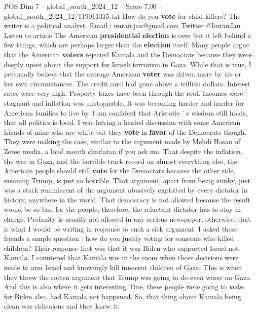 \begin{textsample}{POS Dim 7 – global\_south\_2024\_12 – Score 7.00 – global\_south\_2024\_12/119011315.txt}  \label{ex:f7_pos_348}
How do you \textbf{vote} for child killers?
The writer is a political analyst.
Email : imran.jan@gmail.com Twitter @ImranJan Listen to article The American \textbf{presidential} \textbf{election} is over but it left behind a few things, which are perhaps larger than the \textbf{election} itself.
Many people argue that the American \textbf{voters} rejected Kamala and the Democrats because they were deeply upset about the support for Israeli terrorism in Gaza.
While that is true, I personally believe that the average American \textbf{voter} was driven more by his or her own circumstances.
The credit card had gone above a trillion dollars.
Interest rates were very high.
Property taxes have been through the roof.
Incomes were stagnant and inflation was unstoppable.
It was becoming harder and harder for American families to live by.
I am confident that Aristotle ' s wisdom still holds, that all politics is local.
I was having a heated discussion with some American friends of mine who are white but they \textbf{vote} in \textbf{favor} of the Democrats though.
They were making the case, similar to the argument made by Mehdi Hasan of Zeteo media, a loud mouth charlatan if you ask me.
That despite the inflation, the war in Gaza, and the horrible track record on almost everything else, the American people should still \textbf{vote} for the Democrats because the other side, meaning Trump, is just so horrible.
That argument, apart from being stinky, just was a stark reminiscent of the argument abusively exploited by every dictator in history, anywhere in the world.
That democracy is not allowed because the result would be so bad for the people, therefore, the reluctant dictator has to stay in charge.
Profanity is usually not allowed in any serious newspaper, otherwise, that is what I would be writing in response to such a sick argument.
I asked these friends a simple question : how do you justify voting for someone who killed children?
Their response first was that it was Biden who supported Israel not Kamala.
I countered that Kamala was in the room when those decisions were made to arm Israel and knowingly kill innocent children of Gaza.
This is when they threw the rotten argument that Trump was going to do even worse on Gaza.
And this is also where it gets interesting.
One, these people were going to \textbf{vote} for Biden also, had Kamala not happened.
So, that thing about Kamala being clean was ridiculous and they knew it.

\end{textsample}
